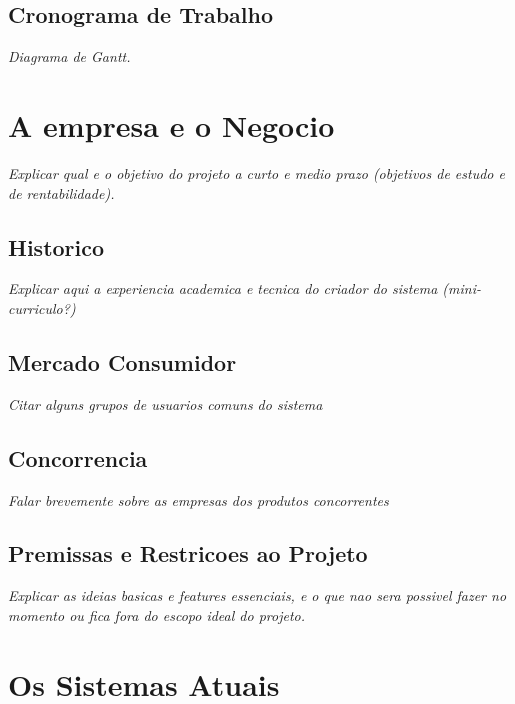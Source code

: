 \documentclass[a4paper,article]{abnt}
\begin{document}
\section{Cronograma de Trabalho}
\emph{Diagrama de Gantt.}

\chapter{A empresa e o Negocio}
\emph{Explicar qual e o objetivo do projeto a curto e medio prazo (objetivos de estudo e de rentabilidade).}

\section{Historico}
\emph{Explicar aqui a experiencia academica e tecnica do criador do sistema (mini-curriculo?)}

\section{Mercado Consumidor}
\emph{Citar alguns grupos de usuarios comuns do sistema}

\section{Concorrencia}
\emph{Falar brevemente sobre as empresas dos produtos concorrentes}

\section{Premissas e Restricoes ao Projeto}
\emph{Explicar as ideias basicas e features essenciais, e o que nao sera possivel fazer no momento ou fica fora do escopo ideal do projeto.}

\chapter{Os Sistemas Atuais}
\end{document}
